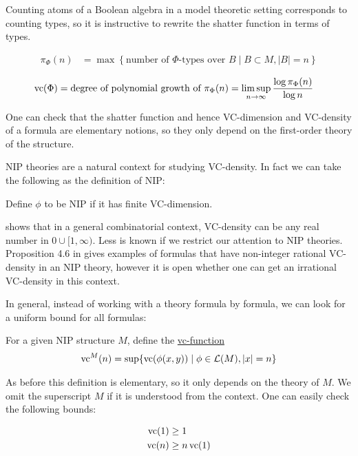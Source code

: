 \documentclass{amsart}
\renewcommand{\LL}{\mathcal L}
\newcommand{\curly}[1]{\left\{#1\right\}}
\newcommand{\defn}{\underline}
\begin{document}
Counting atoms of a Boolean algebra in a model theoretic setting corresponds to counting types,
so it is instructive to rewrite the shatter function in terms of types.

\begin{Definition} 
  \begin{align*}
    \pi_\Phi(n) &= \max \curly{\text{number of $\Phi$-types over $B$} \mid B \subset M, |B| = n}
  \end{align*}
\end{Definition}  

\begin{Lemma} \label{count_types}
  \begin{align*}
    \operatorname{vc}(\Phi) &= \text{degree of polynomial growth of $\pi_\Phi(n)$}  = \limsup_{n \to \infty}\frac{\log \pi_\Phi(n)}{\log n}
  \end{align*}  
\end{Lemma}

One can check that the shatter function and hence VC-dimension and VC-density of a formula are elementary notions,
so they only depend on the first-order theory of the structure.

NIP theories are a natural context for studying VC-density.
In fact we can take the following as the definition of NIP:
\begin{Definition}
  Define $\phi$ to be NIP if it has finite VC-dimension. 
\end{Definition}

\cite{Aschenbrenner_reference_8} shows that in a general combinatorial context,
VC-density can be any real number in $0 \cup [1, \infty)$.
Less is known if we restrict our attention to NIP theories.
Proposition 4.6 in \cite{density} gives examples of formulas that have non-integer rational VC-density in an NIP theory,
however it is open whether one can get an irrational VC-density in this context.

In general, instead of working with a theory formula by formula, we can look for a uniform bound for all formulas:
\begin{Definition}
  For a given NIP structure $M$, define the \defn{vc-function}
  \begin{align*}
    \vc^M(n) = \sup \{\vc(\phi(x, y)) \mid \phi \in \LL(M), |x| = n\}
  \end{align*}
\end{Definition}

As before this definition is elementary, so it only depends on the theory of $M$.
We omit the superscript $M$ if it is understood from the context.
One can easily check the following bounds:
\begin{Lemma} 
  \begin{align*}
    \operatorname{vc}(1) &\geq 1 \\
    \operatorname{vc}(n) &\geq n\operatorname{vc}(1)
  \end{align*}  
\end{Lemma}
\end{document}
